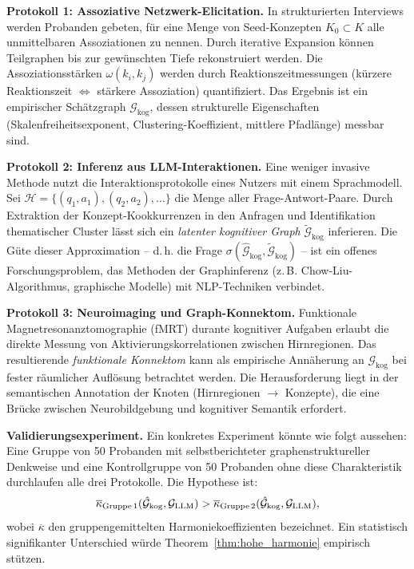 ﻿\documentclass[12pt,a4paper]{article}
\theoremstyle{plain}
\theoremstyle{definition}
\theoremstyle{remark}
\newcommand{\GG}{\mathcal{G}}
\begin{document}
\textbf{Protokoll 1: Assoziative Netzwerk-Elicitation.} In strukturierten Interviews werden Probanden gebeten, für eine Menge von Seed-Konzepten $K_0 \subset K$ alle unmittelbaren Assoziationen zu nennen. Durch iterative Expansion können Teilgraphen bis zur gewünschten Tiefe rekonstruiert werden. Die Assoziationsstärken $\omega(k_i, k_j)$ werden durch Reaktionszeitmessungen (kürzere Reaktionszeit $\Leftrightarrow$ stärkere Assoziation) quantifiziert. Das Ergebnis ist ein empirischer Schätzgraph $\hat{\GG}_{\text{kog}}$, dessen strukturelle Eigenschaften (Skalenfreiheitsexponent, Clustering-Koeffizient, mittlere Pfadlänge) messbar sind.

\textbf{Protokoll 2: Inferenz aus LLM-Interaktionen.} Eine weniger invasive Methode nutzt die Interaktionsprotokolle eines Nutzers mit einem Sprachmodell. Sei $\mathcal{H} = \{(q_1, a_1), (q_2, a_2), \ldots\}$ die Menge aller Frage-Antwort-Paare. Durch Extraktion der Konzept-Kookkurrenzen in den Anfragen und Identifikation thematischer Cluster lässt sich ein \emph{latenter kognitiver Graph} $\tilde{\GG}_{\text{kog}}$ inferieren. Die Güte dieser Approximation -- d.\,h. die Frage $\sigma(\hat{\GG}_{\text{kog}}, \tilde{\GG}_{\text{kog}})$ -- ist ein offenes Forschungsproblem, das Methoden der Graphinferenz (z.\,B. Chow-Liu-Algorithmus, graphische Modelle) mit NLP-Techniken verbindet.

\textbf{Protokoll 3: Neuroimaging und Graph-Konnektom.} Funktionale Magnetresonanztomographie (fMRT) durante kognitiver Aufgaben erlaubt die direkte Messung von Aktivierungskorrelationen zwischen Hirnregionen. Das resultierende \emph{funktionale Konnektom} kann als empirische Annäherung an $\GG_{\text{kog}}$ bei fester räumlicher Auflösung betrachtet werden. Die Herausforderung liegt in der semantischen Annotation der Knoten (Hirnregionen $\to$ Konzepte), die eine Brücke zwischen Neurobildgebung und kognitiver Semantik erfordert.

\textbf{Validierungsexperiment.} Ein konkretes Experiment könnte wie folgt aussehen: Eine Gruppe von 50 Probanden mit selbstberichteter graphenstruktureller Denkweise und eine Kontrollgruppe von 50 Probanden ohne diese Charakteristik durchlaufen alle drei Protokolle. Die Hypothese ist:
\[
  \overline{\kappa}_{\text{Gruppe\,1}}(\hat{\GG}_{\text{kog}}, \GG_{\text{LLM}}) > \overline{\kappa}_{\text{Gruppe\,2}}(\hat{\GG}_{\text{kog}}, \GG_{\text{LLM}}),
\]
wobei $\overline{\kappa}$ den gruppengemittelten Harmoniekoeffizienten bezeichnet. Ein statistisch signifikanter Unterschied würde Theorem~\ref{thm:hohe_harmonie} empirisch stützen.
\end{document}
